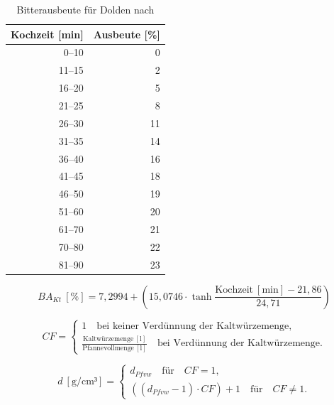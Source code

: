 \documentclass[a4paper,parskip=half]{scrartcl}
\newcommand{\BAKt}{{\mathit{BA}}_{\mathit{Kt}}}
\newcommand{\umin}{\:[\textrm{min}]}
\newcommand{\uden}{\:[\textrm{g/cm³}]}
\newcommand{\uper}{\:[\textrm{\%}]}
\newcommand{\uli}{\:[\textrm{l}]}
\newcommand{\dPfvw}{d_\mathit{Pfvw}}
\begin{document}
\begin{table}[H]
\centering
\begin{tabular}{rr}
\toprule
\multicolumn{1}{c}{\textbf{Kochzeit [min]}} & \multicolumn{1}{c}{\textbf{Ausbeute [\%]}} \\
\midrule
0–10            & 0 \\
11–15           & 2 \\
16–20           & 5 \\
21–25           & 8 \\
26–30           & 11 \\
31–35           & 14 \\
36–40           & 16 \\
41–45           & 18 \\
46–50           & 19 \\
51–60           & 20 \\
61–70           & 21 \\
70–80           & 22 \\
81–90           & 23 \\
\bottomrule
\end{tabular}
\caption{Bitterausbeute für Dolden nach \citeauthor{Garetz1994} \parencite[138]{Garetz1994}}
\label{table:garetzbakt}
\end{table}

\begin{equation}
\BAKt \uper = 7,2994 + \left(15,0746 \cdot \tanh{\frac{\textrm{Kochzeit} \umin - 21,86}{24,71}}\right)
\label{eq:garetzbakt}
\end{equation}


\begin{equation}
\mathit{CF} = \begin{cases}
1 \quad \textrm{bei keiner Verdünnung der Kaltwürzemenge}, \\
\frac{\textrm{Kaltwürzemenge} \uli}{\textrm{Pfannevollmenge} \uli} \quad \textrm{bei Verdünnung der Kaltwürzemenge}.
\end{cases}
\label{eq:garetzcf}
\end{equation}

\begin{equation}
d \uden = \begin{cases}
\dPfvw \quad \textrm{für} \quad \mathit{CF} = 1, \\
\left( \left( \dPfvw - 1 \right) \cdot \mathit{CF} \right) + 1 \quad \textrm{für} \quad \mathit{CF} \ne 1.
\end{cases}
\label{eq:garetzbg}
\end{equation}
\end{document}
